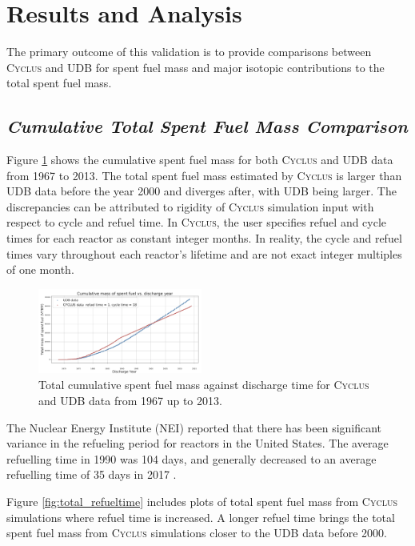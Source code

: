 \documentclass{anstrans}
\newcommand{\Cyclus}{\textsc{Cyclus}\xspace}%
\begin{document}
\section{Results and Analysis}
The primary outcome of this validation is to provide comparisons between \Cyclus and UDB for spent fuel mass and major isotopic contributions to the total spent fuel mass. 

\subsection{\textit{Cumulative Total Spent Fuel Mass Comparison}}
Figure \ref{fig:total_original} shows the cumulative spent fuel mass for both \Cyclus and UDB data from 1967 to 2013. The total spent fuel mass estimated by \Cyclus is larger than UDB data before the year 2000 and diverges after, with UDB being larger. The discrepancies can be attributed to rigidity of \Cyclus simulation input with respect to cycle and refuel time. In \Cyclus, the user specifies refuel and cycle times for each reactor as constant integer months. In reality, the cycle and refuel times vary throughout each reactor's lifetime and are not exact integer multiples of one month. 

\begin{figure}[h] %
	\centering
	\includegraphics[width=0.48\textwidth]{total_cumulative_mass_spent_fuel_original}
	\caption{Total cumulative spent fuel mass against discharge time for \Cyclus and UDB data from 1967 up to 2013.}
	\label{fig:total_original}
\end{figure}

The Nuclear Energy Institute (NEI) reported that there has been significant variance in the refueling period for reactors in the United States. The average refuelling time in 1990 was 104 days, and generally decreased to an average refuelling time of 35 days in 2017 \cite{iaea_current_nodate}.

Figure \ref{fig:total_refueltime} includes plots of total spent fuel mass from \Cyclus simulations where refuel time is increased. A longer refuel time brings the total spent fuel mass from \Cyclus simulations closer to the UDB data before 2000. 
\end{document}

